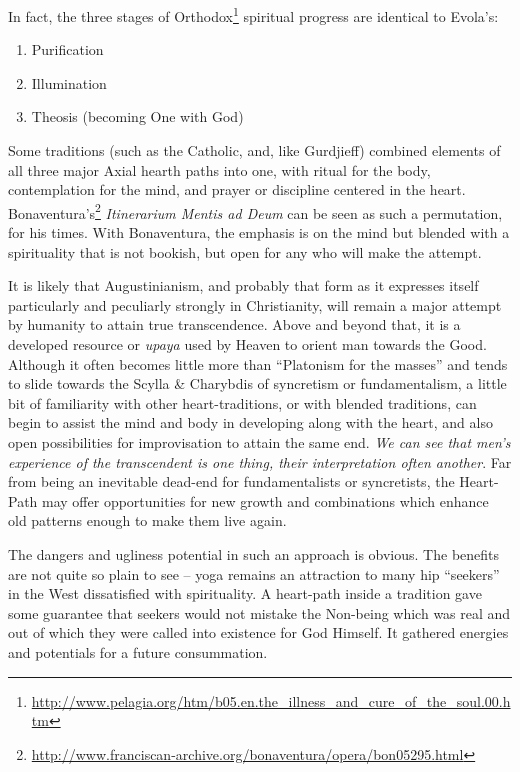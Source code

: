 In fact, the three stages of Orthodox\footnote{\url{http://www.pelagia.org/htm/b05.en.the\_illness\_and\_cure\_of\_the\_soul.00.htm}} spiritual progress are identical to Evola's:

\begin{enumerate}


\item Purification

\item Illumination

\item Theosis (becoming One with God)
\end{enumerate}


Some traditions (such as the Catholic, and, like Gurdjieff) combined elements of all three major Axial hearth paths into one, with ritual for the body, contemplation for the mind, and prayer or discipline centered in the heart. Bonaventura's\footnote{\url{http://www.franciscan-archive.org/bonaventura/opera/bon05295.html}} \emph{Itinerarium Mentis ad Deum} can be seen as such a permutation, for his times. With Bonaventura, the emphasis is on the mind but blended with a spirituality that is not bookish, but open for any who will make the attempt.

It is likely that Augustinianism, and probably that form as it expresses itself particularly and peculiarly strongly in Christianity, will remain a major attempt by humanity to attain true transcendence. Above and beyond that, it is a developed resource or \emph{upaya} used by Heaven to orient man towards the Good. Although it often becomes little more than ``Platonism for the masses'' and tends to slide towards the Scylla \& Charybdis of syncretism or fundamentalism, a little bit of familiarity with other heart-traditions, or with blended traditions, can begin to assist the mind and body in developing along with the heart, and also open possibilities for improvisation to attain the same end. \emph{We can see that men's experience of the transcendent is one thing, their interpretation often another}. Far from being an inevitable dead-end for fundamentalists or syncretists, the Heart-Path may offer opportunities for new growth and combinations which enhance old patterns enough to make them live again.

The dangers and ugliness potential in such an approach is obvious. The benefits are not quite so plain to see -- yoga remains an attraction to many hip ``seekers'' in the West dissatisfied with spirituality. A heart-path inside a tradition gave some guarantee that seekers would not mistake the Non-being which was real and out of which they were called into existence for God Himself. It gathered energies and potentials for a future consummation.

